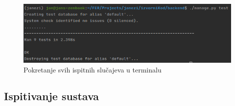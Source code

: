 			\begin{figure}[H]
				\centering
				\includegraphics[scale=0.65]{slike/TestsTerminal.PNG}
				\caption{Pokretanje svih ispitnih slučajeva u terminalu}
				\label{fig:TestsTerminal}
			\end{figure}
			\eject
			
			\subsection{Ispitivanje sustava}
